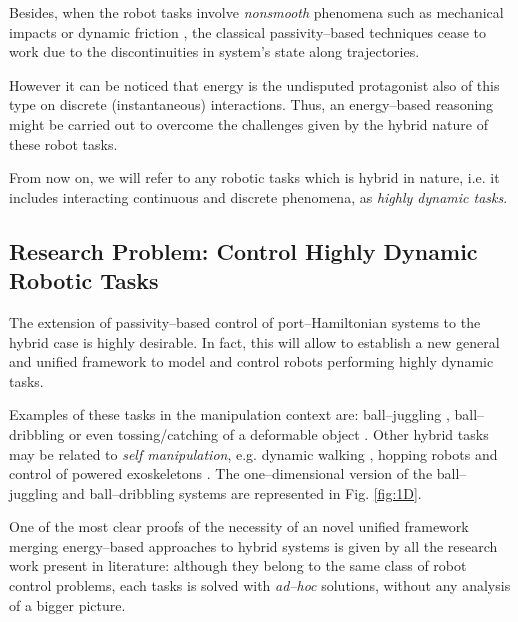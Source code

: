 %
Besides, when the robot tasks involve \textit{nonsmooth} phenomena such as mechanical impacts or dynamic friction \citep{brogliato1999nonsmooth}, the classical passivity--based techniques cease to work due to the discontinuities in system's state along trajectories. 

However it can be noticed that energy is the undisputed protagonist also of this type on discrete (instantaneous) interactions. Thus, an energy--based reasoning might be carried out to overcome the challenges given by the hybrid nature of these robot tasks.  

From now on, we will refer to any robotic tasks which is hybrid in nature, i.e. it includes interacting continuous and discrete phenomena, as \textit{highly dynamic tasks}.
\subsection{Research Problem: Control Highly Dynamic Robotic Tasks}
%
The extension of passivity--based control of port--Hamiltonian systems to the hybrid case is highly desirable. In fact, this will allow to establish a new general and unified framework to model and control robots performing highly dynamic tasks.
%
\newline

%
Examples of these tasks in the manipulation context are:
ball--juggling \citep{sanfelice2007hybrid, tian2013}, ball--dribbling \citep{Batz2010, haddadin2018exploiting} or even tossing/catching of a deformable object \citep{ruggero2018}. 
Other hybrid tasks may be related to \textit{self manipulation}, e.g. dynamic walking \citep{spong2007,westervelt2018feedback}, hopping robots \citep{Ishikawa2003} and control of powered exoskeletons \citep{harib2018feedback,lv2018design}. The one--dimensional version of the ball--juggling and ball--dribbling systems are represented in Fig. \ref{fig:1D}.
%
\newline

%
One of the most clear proofs of the necessity of an novel unified framework merging energy--based approaches to hybrid systems is given by all the research work present in literature: although they belong to the same class of robot control problems, each tasks is solved with \textit{ad--hoc} solutions, without any analysis of a bigger picture.  
%
\newline

